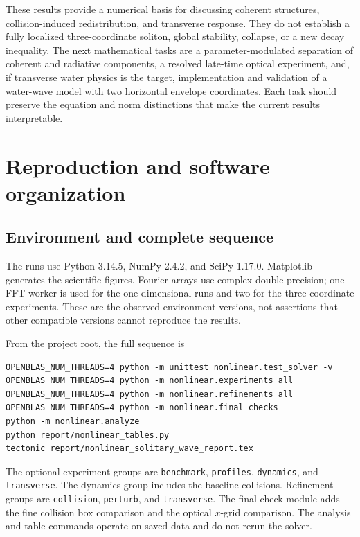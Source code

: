 \documentclass[10pt,letterpaper]{article}
\numberwithin{equation}{section}
\begin{document}
These results provide a numerical basis for discussing coherent structures, collision-induced redistribution, and transverse response. They do not establish a fully localized three-coordinate soliton, global stability, collapse, or a new decay inequality. The next mathematical tasks are a parameter-modulated separation of coherent and radiative components, a resolved late-time optical experiment, and, if transverse water physics is the target, implementation and validation of a water-wave model with two horizontal envelope coordinates. Each task should preserve the equation and norm distinctions that make the current results interpretable.

\appendix
\section{Reproduction and software organization}
\subsection{Environment and complete sequence}
The runs use Python 3.14.5, NumPy 2.4.2, and SciPy 1.17.0. Matplotlib generates the scientific figures. Fourier arrays use complex double precision; one FFT worker is used for the one-dimensional runs and two for the three-coordinate experiments. These are the observed environment versions, not assertions that other compatible versions cannot reproduce the results.

From the project root, the full sequence is
\begin{verbatim}
OPENBLAS_NUM_THREADS=4 python -m unittest nonlinear.test_solver -v
OPENBLAS_NUM_THREADS=4 python -m nonlinear.experiments all
OPENBLAS_NUM_THREADS=4 python -m nonlinear.refinements all
OPENBLAS_NUM_THREADS=4 python -m nonlinear.final_checks
python -m nonlinear.analyze
python report/nonlinear_tables.py
tectonic report/nonlinear_solitary_wave_report.tex
\end{verbatim}
The optional experiment groups are \texttt{benchmark}, \texttt{profiles}, \texttt{dynamics}, and \texttt{transverse}. The dynamics group includes the baseline collisions. Refinement groups are \texttt{collision}, \texttt{perturb}, and \texttt{transverse}. The final-check module adds the fine collision box comparison and the optical $x$-grid comparison. The analysis and table commands operate on saved data and do not rerun the solver.
\end{document}
